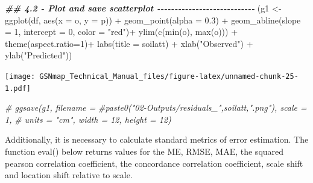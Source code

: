\documentclass[
  10pt,
  b5paper,
  oneside]{book}
\newenvironment{Shaded}{\begin{snugshade}}{\end{snugshade}}
\newcommand{\AttributeTok}[1]{\textcolor[rgb]{0.77,0.63,0.00}{#1}}
\newcommand{\CommentTok}[1]{\textcolor[rgb]{0.56,0.35,0.01}{\textit{#1}}}
\newcommand{\DecValTok}[1]{\textcolor[rgb]{0.00,0.00,0.81}{#1}}
\newcommand{\DocumentationTok}[1]{\textcolor[rgb]{0.56,0.35,0.01}{\textbf{\textit{#1}}}}
\newcommand{\FloatTok}[1]{\textcolor[rgb]{0.00,0.00,0.81}{#1}}
\newcommand{\FunctionTok}[1]{\textcolor[rgb]{0.00,0.00,0.00}{#1}}
\newcommand{\NormalTok}[1]{#1}
\newcommand{\OtherTok}[1]{\textcolor[rgb]{0.56,0.35,0.01}{#1}}
\newcommand{\SpecialCharTok}[1]{\textcolor[rgb]{0.00,0.00,0.00}{#1}}
\newcommand{\StringTok}[1]{\textcolor[rgb]{0.31,0.60,0.02}{#1}}
\begin{document}
\begin{Shaded}
\begin{Highlighting}[]
  \DocumentationTok{\#\# 4.2 {-} Plot and save scatterplot {-}{-}{-}{-}{-}{-}{-}{-}{-}{-}{-}{-}{-}{-}{-}{-}{-}{-}{-}{-}{-}{-}{-}{-}{-}{-}{-}{-}}
\NormalTok{  (g1 }\OtherTok{\textless{}{-}} \FunctionTok{ggplot}\NormalTok{(df, }\FunctionTok{aes}\NormalTok{(}\AttributeTok{x =}\NormalTok{ o, }\AttributeTok{y =}\NormalTok{ p)) }\SpecialCharTok{+} 
     \FunctionTok{geom\_point}\NormalTok{(}\AttributeTok{alpha =} \FloatTok{0.3}\NormalTok{) }\SpecialCharTok{+} 
     \FunctionTok{geom\_abline}\NormalTok{(}\AttributeTok{slope =} \DecValTok{1}\NormalTok{, }\AttributeTok{intercept =} \DecValTok{0}\NormalTok{, }\AttributeTok{color =} \StringTok{"red"}\NormalTok{)}\SpecialCharTok{+}
     \FunctionTok{ylim}\NormalTok{(}\FunctionTok{c}\NormalTok{(}\FunctionTok{min}\NormalTok{(o), }\FunctionTok{max}\NormalTok{(o))) }\SpecialCharTok{+} \FunctionTok{theme}\NormalTok{(}\AttributeTok{aspect.ratio=}\DecValTok{1}\NormalTok{)}\SpecialCharTok{+} 
     \FunctionTok{labs}\NormalTok{(}\AttributeTok{title =}\NormalTok{ soilatt) }\SpecialCharTok{+} 
     \FunctionTok{xlab}\NormalTok{(}\StringTok{"Observed"}\NormalTok{) }\SpecialCharTok{+} \FunctionTok{ylab}\NormalTok{(}\StringTok{"Predicted"}\NormalTok{))}
\end{Highlighting}
\end{Shaded}

\texttt{[image: GSNmap\_Technical\_Manual\_files/figure-latex/unnamed-chunk-25-1.pdf]}

\begin{Shaded}
\begin{Highlighting}[]
  \CommentTok{\# ggsave(g1, filename = }
\CommentTok{\#paste0("02{-}Outputs/residuals\_",soilatt,".png"), scale = 1,}
  \CommentTok{\#        units = "cm", width = 12, height = 12)}
\end{Highlighting}
\end{Shaded}

Additionally, it is necessary to calculate standard metrics of error estimation. The function eval() below returns values for the ME, RMSE, MAE, the squared pearson correlation coefficient, the concordance correlation coefficient, scale shift and location shift relative to scale.

\begin{Shaded}
\end{Shaded}
\end{document}

